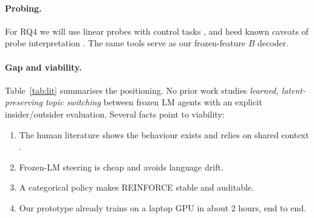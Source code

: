 \documentclass[10pt,a4paper,twocolumn]{article}
\newcommand{\1}{\mathbb{1}}
\begin{document}
\paragraph{Probing.}
For RQ4 we will use linear probes \citep{alain2016understanding} with control tasks \citep{hewitt2019designing}, and heed known caveats of probe interpretation \citep{belinkov2022probing}. The same tools serve as our frozen-feature $B$ decoder.

\begin{table}[t]
\centering\footnotesize
\setlength{\tabcolsep}{2.2pt}
\caption{Positioning. ``Insider ctx'': what the receiver shares with the sender beyond the message. ``Outsider eval'': how the eavesdropper is modelled.}
\label{tab:lit}
\end{table}

\paragraph{Gap and viability.} Table~\ref{tab:lit} summarises the positioning.
No prior work studies \emph{learned, latent-preserving topic switching} between frozen LM agents with an explicit insider/outsider evaluation. Several facts point to viability:
\begin{enumerate}
\item The human literature shows the behaviour exists and relies on shared context \citep{clark1987concealing}.
\item Frozen-LM steering is cheap and avoids language drift.
\item A categorical policy makes REINFORCE stable and auditable.
\item Our prototype already trains on a laptop GPU in about 2 hours, end to end.
\end{enumerate}
\end{document}
